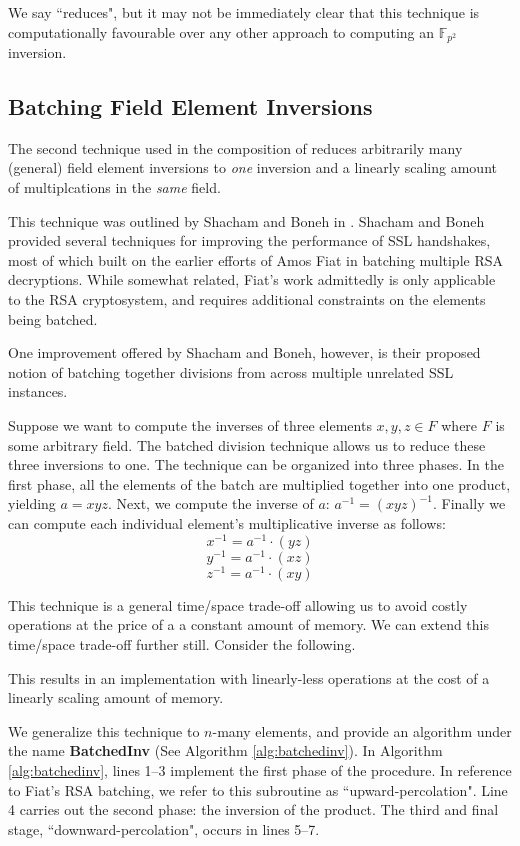 We say ``reduces", but it may not be immediately clear that this technique is computationally favourable over any other approach to computing an $\mathbb{F}_{p^{2}}$ inversion. 

\subsection{Batching Field Element Inversions}

The second technique used in the composition of  reduces arbitrarily many (general) field element inversions to \emph{one} inversion and a linearly scaling amount of multiplcations in the \emph{same} field.

This technique was outlined by Shacham and Boneh in \cite{batching}. Shacham and Boneh provided several techniques for improving the performance of SSL handshakes, most of which built on the earlier efforts of Amos Fiat in batching multiple RSA decryptions. While somewhat related, Fiat's work admittedly is only applicable to the RSA cryptosystem, and requires additional constraints on the elements being batched. 

One improvement offered by Shacham and Boneh, however, is their proposed notion of batching together divisions from across multiple unrelated SSL instances. 

Suppose we want to compute the inverses of three elements $x, y, z \in F$ where $F$ is some arbitrary field. The batched division technique allows us to reduce these three inversions to one. The technique can be organized into three phases. In the first phase, all the elements of the batch are multiplied together into one product, yielding $a = xyz$. Next, we compute the inverse of $a$: $a^{-1} = (xyz)^{-1}$. Finally we can compute each individual element's multiplicative inverse as follows:
$$
x^{-1} = a^{-1} \cdot (yz)
$$
$$
y^{-1} = a^{-1} \cdot (xz)
$$
$$
z^{-1} = a^{-1} \cdot (xy)
$$

This technique is a general time/space trade-off allowing us to avoid costly operations at the price of a a constant amount of memory. We can extend this time/space trade-off further still. Consider the following. 

This results in an implementation with linearly-less operations at the cost of a linearly scaling amount of memory.

We generalize this technique to $n$-many elements, and provide an algorithm under the name \textbf{BatchedInv} (See Algorithm \ref{alg:batchedinv}). In Algorithm \ref{alg:batchedinv}, lines 1--3 implement the first phase of the procedure. In reference to Fiat's RSA batching, we refer to this subroutine as ``upward-percolation". Line 4 carries out the second phase: the inversion of the product. The third and final stage, ``downward-percolation", occurs in lines 5--7.

